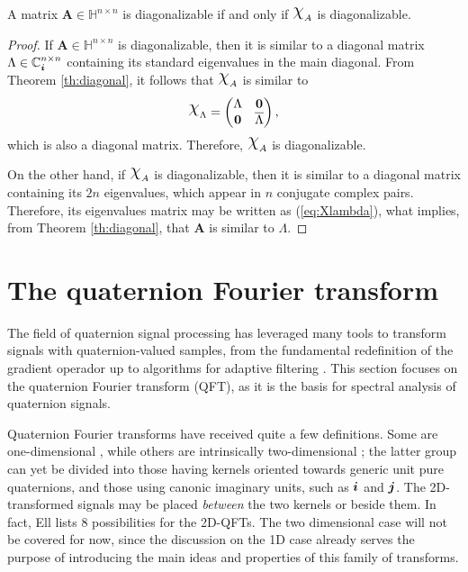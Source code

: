 \begin{corollary}
\label{cor:diagonalizable}
A matrix $  \mathbf{A} \in \mathbb{H}^{n \times n} $ is diagonalizable if and only if $ \rchi_A $ is diagonalizable.
\end{corollary}
\begin{proof}
If $ \mathbf{A} \in \mathbb{H}^{n \times n} $ is diagonalizable, then it is similar to a diagonal matrix $ \Lambda \in \mathbb{C}^{n \times n}_{\boldsymbol{i}} $ containing its standard eigenvalues in the main diagonal. From Theorem \ref{th:diagonal}, it follows that $ \rchi_A $ is similar to
\begin{equation}
\label{eq:Xlambda}
\rchi_{\Lambda} =
\begin{pmatrix}
\Lambda & \mathbf{0}\\ 
\mathbf{0} & \overline{\Lambda}
\end{pmatrix},
\end{equation}
which is also a diagonal matrix. Therefore, $ \rchi_A $ is diagonalizable.

On the other hand, if $ \rchi_A $ is diagonalizable, then it is similar to a diagonal matrix containing its $ 2n $ eigenvalues, which appear in $ n $ conjugate complex pairs. Therefore, its eigenvalues matrix may be written as (\ref{eq:Xlambda}), what implies, from Theorem \ref{th:diagonal}, that $ \mathbf{A} $ is similar to $ \Lambda $.
\end{proof}

\section{The quaternion Fourier transform}
\label{sec:QFT}
The field of quaternion signal processing has leveraged many tools to transform signals with quaternion-valued samples, from the fundamental redefinition of the gradient operador \cite{jiang2014general} up to algorithms for adaptive filtering \cite{jiang2013frequency}. This section focuses on the quaternion Fourier transform (QFT), as it is the basis for spectral analysis of quaternion signals.

Quaternion Fourier transforms have received quite a few definitions. Some are one-dimensional \cite{flamant2017spectral}, while others are intrinsically two-dimensional \cite{guanlei2008fractional}; the latter group can yet be divided into those having kernels oriented towards generic unit pure quaternions, and those using canonic imaginary units, such as $ \boldsymbol{i} $ and $ \boldsymbol{j} $. The 2D-transformed signals may be placed \textit{between} the two kernels or beside them. In fact, Ell \cite[sec. 3.2]{ell2014quaternion} lists 8 possibilities for the 2D-QFTs. The two dimensional case will not be covered for now, since the discussion on the 1D case already serves the purpose of introducing the main ideas and properties of this family of transforms.

